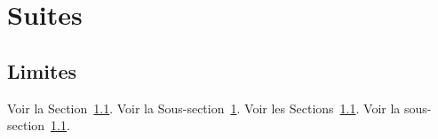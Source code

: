 \section{Suites}\label{sec:renvoi-suites}
\subsection{Limites}\label{ssec:renvoi-limites}

Voir la Section~\ref{ssec:renvoi-limites}. %
Voir la Sous-section~\ref{sec:renvoi-suites}. %
Voir les Sections~\ref{ssec:renvoi-limites}. %
Voir la sous-section~\ref{ssec:renvoi-limites}. %
